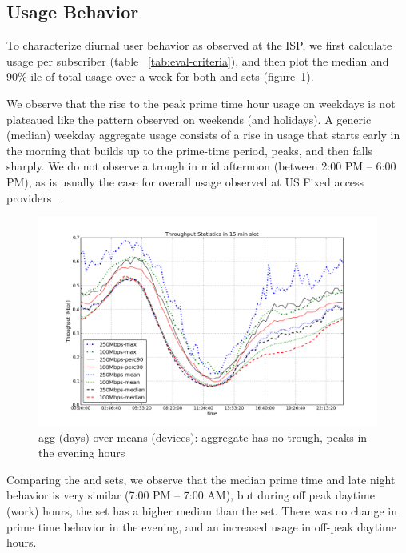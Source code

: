\subsection{Usage Behavior}
\label{subsec:behavior}

To characterize diurnal user behavior as observed at the ISP, we first calculate
usage per subscriber (table ~\ref{tab:eval-criteria}), and then plot the median and
90\%-ile of total usage over a week for both \test and \control
sets (figure~\ref{fig:TS-data-rate-daily}).

We observe that the rise to the peak prime time hour usage on weekdays
is not plateaued like the pattern observed on weekends (and holidays).
A generic (median) weekday aggregate usage consists of a rise in usage that starts
early in the morning that builds up to the prime-time period, peaks, and then falls sharply.
We do not observe a trough in mid afternoon (between 2:00 PM -- 6:00 PM), as is usually
the case for overall usage observed at US Fixed access providers ~\cite{sandvine2014report1}.

\begin{figure}[ht!]
\begin{minipage}{\linewidth}
  \centering
  \includegraphics[width=\linewidth]{figures/describe-total-throughput-per-day[replace].png}
  \caption{agg (days) over means (devices): aggregate has no trough, peaks in the evening hours}
  \label{fig:TS-data-rate-daily}
\end{minipage}
\end{figure}

Comparing the \test and \control sets, we observe that the median prime time and late night
behavior is very similar (7:00 PM -- 7:00 AM), but during off peak daytime (work) hours,
the \test set has a higher median than the \control set. There was no change in
prime time behavior in the evening, and an increased usage in off-peak daytime hours.


